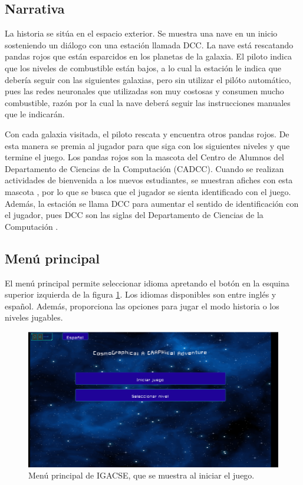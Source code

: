 \subsection{Narrativa}

La historia se sitúa en el espacio exterior. Se muestra una nave en un inicio sosteniendo un diálogo con una estación llamada DCC.
La nave está rescatando pandas rojos que están esparcidos en los planetas de la galaxia. El piloto indica 
que los niveles de combustible están bajos, a lo cual la estación le indica que debería seguir con las siguientes
galaxias, pero sin utilizar el pilóto automático, pues las redes neuronales que utilizadas son muy costosas y consumen 
mucho combustible, razón por la cual la nave deberá seguir las instrucciones manuales que le indicarán.

Con cada galaxia visitada, el piloto rescata y encuentra otros pandas rojos. De esta manera se premia al jugador para
que siga con los siguientes niveles y que termine el juego. Los pandas rojos son la mascota del Centro de Alumnos del Departamento de Ciencias 
de la Computación (CADCC). Cuando se realizan actividades de bienvenida a los nuevos estudiantes, se muestran afiches con esta mascota \cite{CADCCPage}, por lo que se busca que el jugador se sienta identificado con el juego. Además, la estación se llama DCC para aumentar el sentido de identificación con el jugador, pues DCC son las siglas del Departamento de Ciencias de la Computación \cite{DCCPage}.


\subsection{Menú principal}

El menú principal permite seleccionar idioma apretando el botón en la esquina superior izquierda de la figura \ref{MenuPrincipal}. Los idiomas disponibles son entre inglés y español. Además, proporciona las opciones para jugar el modo historia o los niveles jugables.

\begin{figure}[h]
	\centering
	\includegraphics[scale=0.3]{imagenes/MainMenu.png}
	\caption{Menú principal de IGACSE, que se muestra al iniciar el juego.}
	\label{MenuPrincipal}
\end{figure}


